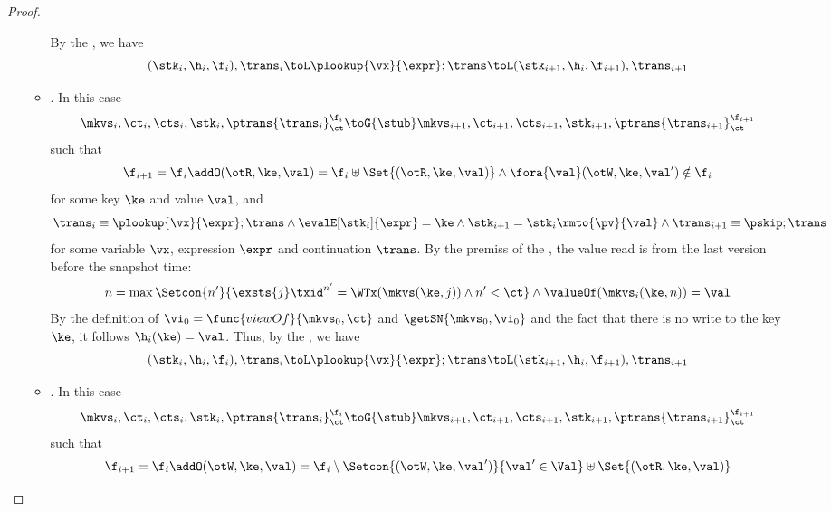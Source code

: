\begin{proof}
\begin{itemize}
\begin{itemize}
                By the , we have 
                \[
                    (\stk_i, \h_i, \f_i), \trans_i \toL \plookup{\vx}{\expr} ; \trans 
                    \toL (\stk_{i+1}, \h_i, \f_{i+1} ), \trans_{i+1}
                \]
            \item {}.
                In this case
                \[
                    \mkvs_i, \ct_i, \cts_i, \stk_i, \ptrans{\trans_i}_\ct^{\f_i}
                    \toG{\stub}
                    \mkvs_{i+1}, \ct_{i+1}, \cts_{i+1}, \stk_{i+1}, \ptrans{\trans_{i+1}}_\ct^{\f_{i+1}}
                \]
                such that
                \[
                    \f_{i+1} = \f_i \addO (\otR, \ke, \val) = \f_i \uplus \Set{(\otR, \ke, \val)}
                    \land \fora{\val} (\otW,\ke, \val') \notin \f_i
                \]
                for some key \( \ke \) and value \( \val \), and
                \[
                    \trans_{i} \equiv \plookup{\vx}{\expr} ; \trans 
                    \land \evalE[\stk_i]{\expr} = \ke 
                    \land \stk_{i+1} = \stk_i\rmto{\pv}{\val}
                    \land  \trans_{i+1} \equiv \pskip ; \trans
                \]
                for some variable \( \vx \), expression \( \expr \) and continuation \( \trans \).
                By the premiss of the , the value read is from the last version before the snapshot time:
                \[
                    n = \max\Setcon{n'}{%
                        \exsts{j} \txid^{n'} = \WTx(\mkvs(\ke, j)) \land n' < \ct%
                    } 
                    \land \valueOf(\mkvs_i(\ke,n) ) = \val
                \]                 
                By the definition of \( \vi_0 = \func{viewOf}{\mkvs_0,\ct} \) and \( \getSN{\mkvs_0,\vi_0} \) and the fact that there is no write to the key \( \ke \),
                it follows \( \h_i(\ke) = \val \).
                Thus, by the , we have 
                \[
                    (\stk_i, \h_i, \f_i), \trans_i \toL \plookup{\vx}{\expr} ; \trans 
                    \toL (\stk_{i+1}, \h_i, \f_{i+1} ), \trans_{i+1}
                \]
            \item {}.
                In this case
                \[
                    \mkvs_i, \ct_i, \cts_i, \stk_i, \ptrans{\trans_i}_\ct^{\f_i}
                    \toG{\stub}
                    \mkvs_{i+1}, \ct_{i+1}, \cts_{i+1}, \stk_{i+1}, \ptrans{\trans_{i+1}}_\ct^{\f_{i+1}}
                \]
                such that
                \[
                    \f_{i+1} = \f_i \addO (\otW, \ke, \val) = \f_i \setminus \Setcon{(\otW, \ke, \val')}{\val' \in \Val} \uplus \Set{(\otR, \ke, \val)}
\]
\end{itemize}
\end{itemize}
\end{proof}
